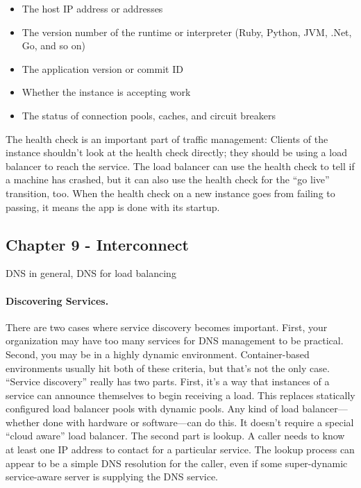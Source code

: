 \begin{itemize}

\item The host IP address or addresses
\item The version number of the runtime or interpreter (Ruby, Python, JVM, .Net, Go, and so on)
\item The application version or commit ID
\item Whether the instance is accepting work
\item The status of connection pools, caches, and circuit breakers

\end{itemize}

The health check is an important part of traffic management: Clients of the instance shouldn’t look at the health check directly; they should be using a load balancer to reach the service. The load balancer can use the health check to tell if a machine has crashed, but it can also use the health check for the “go live” transition, too. When the health check on a new instance goes from failing to passing, it means the app is done with its startup.


\subsection{Chapter 9 - Interconnect}

DNS in general, DNS for load balancing

\paragraph{Discovering Services.} There are two cases where service discovery becomes important. First, your organization may have too many services for DNS management to be practical. Second, you may be in a highly dynamic environment. Container-based environments usually hit both of these criteria, but that’s not the only case. “Service discovery” really has two parts. First, it’s a way that instances of a service can announce themselves to begin receiving a load. This replaces statically configured load balancer pools with dynamic pools. Any kind of load balancer—whether done with hardware or software—can do this. It doesn’t require a special “cloud aware” load balancer. The second part is lookup. A caller needs to know at least one IP address to contact for a particular service. The lookup process can appear to be a simple DNS resolution for the caller, even if some super-dynamic service-aware server is supplying the DNS service.





